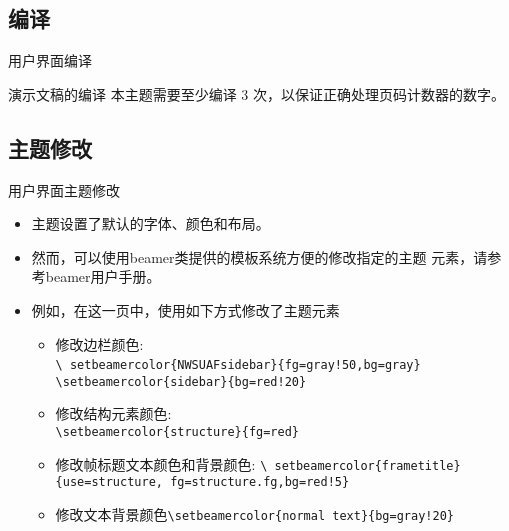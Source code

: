 \subsection{编译}
\begin{frame}{用户界面}{编译}
  \begin{block}{演示文稿的编译}
    本主题需要至少编译 \alert{3} 次，以保证正确处理页码计数器的数字。
  \end{block}
\end{frame}

\subsection{主题修改}
{
  \begin{frame}{用户界面}{主题修改}
    \begin{itemize}
    \item<1-> 主题设置了默认的字体、颜色和布局。
    \item<2-> 然而，可以使用beamer类提供的模板系统方便的修改指定的主题
      元素，请参考beamer用户手册。
    \item<3-> 例如，在这一页中，使用如下方式修改了主题元素
      \begin{itemize}
      \item 修改边栏颜色:\\
        {\tt \textbackslash
          setbeamercolor\{NWSUAFsidebar\}\{fg=gray!50,bg=gray\}} {\tt
          \textbackslash setbeamercolor\{sidebar\}\{bg=red!20\}}
      \item 修改结构元素颜色:\\
        {\tt \textbackslash setbeamercolor\{structure\}\{fg=red\}}\\
      \item 修改帧标题文本颜色和背景颜色: {\tt \textbackslash
          setbeamercolor\{frametitle\}\{use=structure,
          fg=structure.fg,bg=red!5\}}
      \item 修改文本背景颜色{\tt \textbackslash setbeamercolor\{normal
          text\}\{bg=gray!20\}}
      \end{itemize}
    \end{itemize}
  \end{frame}}

